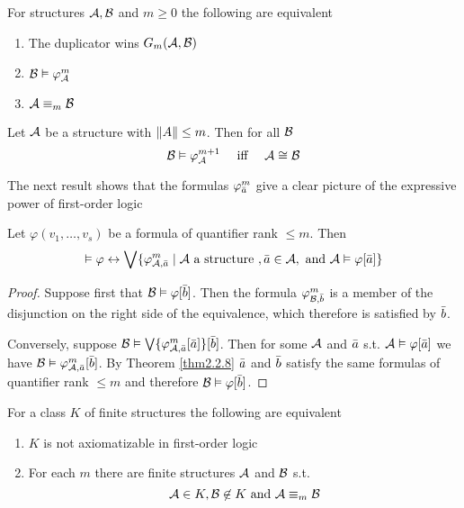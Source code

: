 \documentclass[11pt]{article}
\begin{document}
\begin{corollary}[]
For structures \(\mathcal{A},\mathcal{B}\) and \(m\ge0\) the following are equivalent
\begin{enumerate}
\item The duplicator wins \(G_m(\mathcal{A},\mathcal{B})\)
\item \(\mathcal{B}\vDash\varphi_{\mathcal{A}}^m\)
\item \(\mathcal{A}\equiv_m\mathcal{B}\)
\end{enumerate}
\end{corollary}

\begin{corollary}[]
Let \(\mathcal{A}\) be a structure with \(\left\lVert A\right\rVert\le m\). Then for all \(\mathcal{B}\)
\begin{equation*}
\mathcal{B}\vDash\varphi_{\mathcal{A}}^{m+1}
\quad\text{ iff }\quad
\mathcal{A}\cong\mathcal{B}
\end{equation*}
\end{corollary}

The next result shows that the formulas \(\varphi_{\bar{a}}^m\) give a clear picture of the
expressive power of first-order logic

\begin{theorem}[]
Let \(\varphi(v_1,\dots,v_s)\) be a formula of quantifier rank \(\le m\). Then
\begin{equation*}
\vDash\varphi\leftrightarrow
\bigvee
\{\varphi_{\mathcal{A},\bar{a}}^m\mid\mathcal{A}\text{ a structure },
\bar{a}\in\mathcal{A},\text{ and }\mathcal{A}\vDash\varphi[\bar{a}]\}
\end{equation*}
\end{theorem}

\begin{proof}
Suppose first that \(\mathcal{B}\vDash\varphi[\bar{b}]\). Then the formula \(\varphi_{\mathcal{B},\bar{b}}^m\) is
a member of the disjunction on the right side of the equivalence, which therefore is satisfied
by \(\bar{b}\).

Conversely, suppose \(\mathcal{B}\vDash\bigvee\{\varphi_{\mathcal{A},\bar{a}}^m[\bar{a}]\}[\bar{b}]\). Then for
some \(\mathcal{A}\) and \(\bar{a}\) s.t. \(\mathcal{A}\vDash\varphi[\bar{a}]\) we
have \(\mathcal{B}\vDash\varphi_{\mathcal{A},\bar{a}}^m[\bar{b}]\). By Theorem \ref{thm2.2.8} \(\bar{a}\)
and \(\bar{b}\) satisfy the same formulas of quantifier rank \(\le m\) and therefore \(\mathcal{B}\vDash\varphi[\bar{b}]\).
\end{proof}

\begin{theorem}[]
\label{thm2.2.12}
For a class \(K\) of finite structures the following are equivalent
\begin{enumerate}
\item \(K\) is not axiomatizable in first-order logic
\item For each \(m\) there are finite structures \(\mathcal{A}\) and \(\mathcal{B}\) s.t.
\begin{equation*}
\mathcal{A}\in K,\mathcal{B}\not\in K\text{ and }\mathcal{A}\equiv_m\mathcal{B}
\end{equation*}
\end{enumerate}
\end{theorem}
\end{document}
